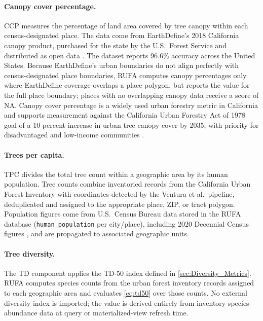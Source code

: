 \paragraph{Canopy cover percentage.}
CCP measures the percentage of land area covered by tree canopy within each census-designated place. The data come from EarthDefine's 2018 California canopy product, purchased for the state by the U.S.\ Forest Service and distributed as open data \cite{earthdefineTreemap,usfsEarthdefine}. The dataset reports 96.6\% accuracy across the United States. Because EarthDefine's urban boundaries do not align perfectly with census-designated place boundaries, RUFA computes canopy percentages only where EarthDefine coverage overlaps a place polygon, but reports the value for the full place boundary; places with no overlapping canopy data receive a score of NA. Canopy cover percentage is a widely used urban forestry metric in California and supports measurement against the California Urban Forestry Act of 1978 goal of a 10-percent increase in urban tree canopy cover by 2035, with priority for disadvantaged and low-income communities \cite{urbanForestryAct1978}.

\paragraph{Trees per capita.}
TPC divides the total tree count within a geographic area by its human population. Tree counts combine inventoried records from the California Urban Forest Inventory with coordinates detected by the Ventura et al.\ pipeline, deduplicated and assigned to the appropriate place, ZIP, or tract polygon. Population figures come from U.S.\ Census Bureau data stored in the RUFA database (\texttt{human\_population} per city/place), including 2020 Decennial Census figures \cite{census2020}, and are propagated to associated geographic units.

\paragraph{Tree diversity.}
The TD component applies the TD-50 index defined in \autoref{sec:Diversity_Metrics}. RUFA computes species counts from the urban forest inventory records assigned to each geographic area and evaluates \autoref{eq:td50} over those counts. No external diversity index is imported; the value is derived entirely from inventory species-abundance data at query or materialized-view refresh time.

